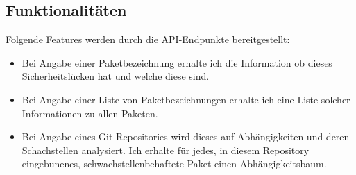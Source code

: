 \subsection{Funktionalitäten} \label{sec:Funktionalitäten}
Folgende Features werden durch die API-Endpunkte bereitgestellt:
\begin{itemize}
    \item Bei Angabe einer Paketbezeichnung erhalte ich die Information ob dieses Sicherheitslücken hat und welche diese sind.
    \item Bei Angabe einer Liste von Paketbezeichnungen erhalte ich eine Liste solcher Informationen zu allen Paketen.
    \item Bei Angabe eines Git-Repositories wird dieses auf Abhängigkeiten und deren Schachstellen analysiert.
        Ich erhalte für jedes, in diesem Repository eingebunenes, schwachstellenbehaftete Paket einen Abhängigkeitsbaum.
\end{itemize}